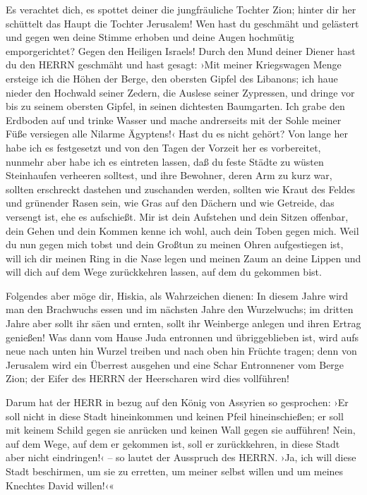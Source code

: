 Es verachtet dich, es spottet deiner die jungfräuliche Tochter Zion;
hinter dir her schüttelt das Haupt die Tochter Jerusalem!
Wen hast du geschmäht und gelästert und gegen wen deine
Stimme erhoben und deine Augen hochmütig emporgerichtet? Gegen den
Heiligen Israels! Durch den Mund deiner Diener hast du
den HERRN geschmäht und hast gesagt: ›Mit meiner Kriegswagen Menge
ersteige ich die Höhen der Berge, den obersten Gipfel des Libanons; ich
haue nieder den Hochwald seiner Zedern, die Auslese seiner Zypressen,
und dringe vor bis zu seinem obersten Gipfel, in seinen dichtesten
Baumgarten. Ich grabe den Erdboden auf und trinke Wasser
und mache andrerseits mit der Sohle meiner Füße versiegen alle Nilarme
Ägyptens!‹ Hast du es nicht gehört? Von lange her habe
ich es festgesetzt und von den Tagen der Vorzeit her es vorbereitet,
nunmehr aber habe ich es eintreten lassen, daß du feste Städte zu wüsten
Steinhaufen verheeren solltest, und ihre Bewohner, deren
Arm zu kurz war, sollten erschreckt dastehen und zuschanden werden,
sollten wie Kraut des Feldes und grünender Rasen sein, wie Gras auf den
Dächern und wie Getreide, das versengt ist, ehe es aufschießt.
Mir ist dein Aufstehen und dein Sitzen offenbar, dein
Gehen und dein Kommen kenne ich wohl, auch dein Toben gegen mich.
Weil du nun gegen mich tobst und dein Großtun zu meinen
Ohren aufgestiegen ist, will ich dir meinen Ring in die Nase legen und
meinen Zaum an deine Lippen und will dich auf dem Wege zurückkehren
lassen, auf dem du gekommen bist.

Folgendes aber möge dir, Hiskia, als Wahrzeichen dienen:
In diesem Jahre wird man den Brachwuchs essen und im nächsten Jahre den
Wurzelwuchs; im dritten Jahre aber sollt ihr säen und ernten, sollt ihr
Weinberge anlegen und ihren Ertrag genießen! Was dann vom
Hause Juda entronnen und übriggeblieben ist, wird aufs neue nach unten
hin Wurzel treiben und nach oben hin Früchte tragen; denn
von Jerusalem wird ein Überrest ausgehen und eine Schar Entronnener vom
Berge Zion; der Eifer des HERRN der Heerscharen wird dies vollführen!

Darum hat der HERR in bezug auf den König von Assyrien so
gesprochen: ›Er soll nicht in diese Stadt hineinkommen und keinen Pfeil
hineinschießen; er soll mit keinem Schild gegen sie anrücken und keinen
Wall gegen sie aufführen! Nein, auf dem Wege, auf dem er
gekommen ist, soll er zurückkehren, in diese Stadt aber nicht
eindringen!‹ -- so lautet der Ausspruch des HERRN. ›Ja,
ich will diese Stadt beschirmen, um sie zu erretten, um meiner selbst
willen und um meines Knechtes David willen!‹«

